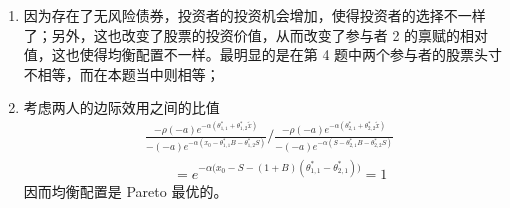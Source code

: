 \begin{solution}
\begin{enumerate}[label=(\alph*)]
\begin{align}
            \tag{11.1}\\
            -e^{-\alpha(x_{0}-\theta_{1,1}^{*}B-\theta_{1,2}^{*}S)}(\alpha S)
            &=\rho e^{-\alpha(\theta_{1,1}^{*}+\theta_{1,2}^{*}\tilde{x})+\frac12\alpha^{2}(\theta_{1,2}^{*})^{2}\sigma^{2}}(-\alpha\bar{x}+\alpha^{2}\theta_{1,2}^{*}\sigma^{2})
            \tag{11.2}
    \end{align}
    参与者 2 的最优化的一阶条件是
    \begin{align}
            -e^{-\alpha(S-\theta_{2,1}^{*}B-\theta_{2,2}^{*}S)}(\alpha B)
            &=\rho e^{-\alpha(\theta_{2,1}^{*}+\theta_{2,2}^{*}\tilde{x})+\frac12\alpha^{2}(\theta_{2,2}^{*})^{2}\sigma^{2}}(-\alpha)
            \tag{11.3}\\
            -e^{-\alpha(S-\theta_{2,1}^{*}B-\theta_{2,2}^{*}S)}(\alpha S)
            &=\rho e^{-\alpha(\theta_{2,1}^{*}+\theta_{2,2}^{*}\tilde{x})+\frac12\alpha^{2}(\theta_{2,2}^{*})^{2}\sigma^{2}}(-\alpha\bar{x}+\alpha^{2}\theta_{2,2}^{*}\sigma^{2})
            \tag{11.4}
    \end{align}
    (11.2) 式/(11.1) 式，(11.4) 式/(11.3) 式可得
    \[
        \begin{aligned}
            \frac{S}{B}&=\bar{x}-\alpha\theta_{1,2}^{*}\sigma^{2}\\
            \frac{S}{B}&=\bar{x}-\alpha\theta_{2,2}^{*}\sigma^{2}
        \end{aligned}
    \]
    因此 $\theta_{1,2}^{*}=\theta_{2,2}^{*}=\tfrac12$。\\
    (11.3) 式/(11.1) 式可得
    \[
        e^{\alpha(x_{0}-S)+\alpha B(\theta_{2,1}^{*}-\theta_{1,1}^{*})}=e^{\alpha(\theta_{1,1}^{*}-\theta_{2,1}^{*})}
    \]
    因此，$\theta_{1,1}^{*}=-\theta_{2,1}^{*}=\dfrac{x_{0}}{2(1+B)}\widehat{S}$。利用 $\dfrac{\widehat{S}}{B}=\bar{x}-\tfrac12\alpha\sigma^{2}$，$\theta_{1,1}^{*}=-\theta_{2,1}^{*}=\dfrac{x_{0}-\widehat{S}}{2(1+B)}$ 以及 (11.1) 式就可求得债券价格 $B$ 以及股票价格 $S$。
    \item 因为存在了无风险债券，投资者的投资机会增加，使得投资者的选择不一样了；另外，这也改变了股票的投资价值，从而改变了参与者 2 的禀赋的相对值，这也使得均衡配置不一样。最明显的是在第 4 题中两个参与者的股票头寸不相等，而在本题当中则相等；
    \item 考虑两人的边际效用之间的比值
    \[
        \begin{aligned}
            &\frac{-\rho(-a)e^{-\alpha(\theta_{1,1}^{*}+\theta_{1,2}^{*}\tilde{x})}}{-(-a)e^{-\alpha(x_{0}-\theta_{1,1}^{*}B-\theta_{1,2}^{*}S)}}
            \Big/
            \frac{-\rho(-a)e^{-\alpha(\theta_{2,1}^{*}+\theta_{2,2}^{*}\tilde{x})}}{-(-a)e^{-\alpha(S-\theta_{2,1}^{*}B-\theta_{2,2}^{*}S)}}\\
            &\qquad=e^{-\alpha\bigl(x_{0}-S-(1+B)(\theta_{1,1}^{*}-\theta_{2,1}^{*})\bigr)}=1
        \end{aligned}
    \]
    因而均衡配置是 Pareto 最优的。
\end{enumerate}
\end{solution}

